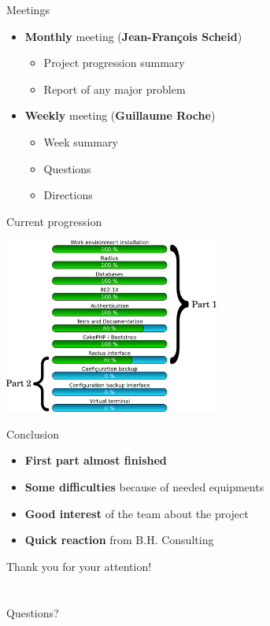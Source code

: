 \documentclass[12pt]{beamer}
\begin{document}
\begin{frame}{Meetings}
\begin{itemize}
    \item \textbf{Monthly} meeting (\textbf{Jean-François Scheid})
	\vspace{0.2cm}
	\begin{itemize}
	\item Project progression summary
	\item Report of any major problem
	\end{itemize}
	\vspace{0.8cm}\pause
    \item \textbf{Weekly} meeting (\textbf{Guillaume Roche})
	\vspace{0.2cm}
	\begin{itemize}
	\item Week summary
	\item Questions
	\item Directions
	\end{itemize}
    \end{itemize}
\end{frame}

\begin{frame}{Current progression}
    \begin{center}
         \includegraphics[width=200pt]{img/progress.pdf}
    \end{center}
\end{frame}

\begin{frame}{Conclusion}
    \begin{itemize}
	\item \textbf{First part almost finished}
	\vfill
	\item \textbf{Some difficulties} because of needed equipments
	\vfill
	\item \textbf{Good interest} of the team about the project
	\vfill
	\item \textbf{Quick reaction} from B.H. Consulting
    \end{itemize}
\end{frame}

\begin{frame}{}
    \begin{center}
	{\huge{Thank you for your attention!\\~\\~\\}}
	{\huge{Questions?}}
    \end{center}
\end{frame}
\end{document}
